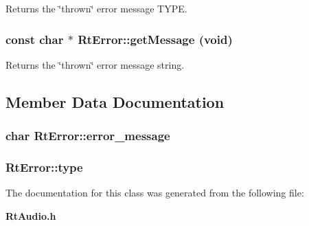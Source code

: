 Returns the \char`\"{}thrown\char`\"{} error message TYPE.

\subsubsection{\setlength{\rightskip}{0pt plus 5cm}const char $\ast$ Rt\-Error::get\-Message (void)\hspace{0.3cm}{\tt  [inline, virtual]}}\label{classRtError_a4}


Returns the \char`\"{}thrown\char`\"{} error message string.



\subsection{Member Data Documentation}
\subsubsection{\setlength{\rightskip}{0pt plus 5cm}char Rt\-Error::error\_\-message\hspace{0.3cm}{\tt  [protected]}}\label{classRtError_n0}


\subsubsection{ Rt\-Error::type\hspace{0.3cm}{\tt  [protected]}}\label{classRtError_n1}




The documentation for this class was generated from the following file:\begin{CompactItemize}
\item 
{\bf Rt\-Audio.h}\end{CompactItemize}
